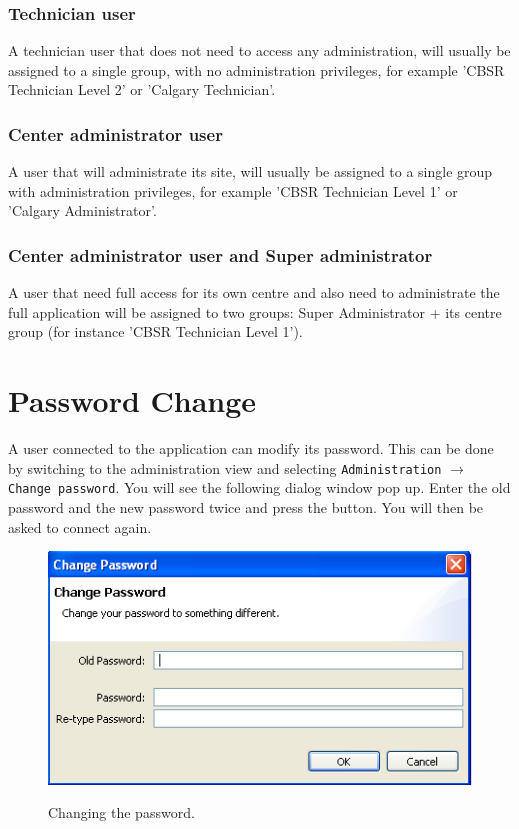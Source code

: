\subsubsection{Technician user}
A technician user that does not need to access any administration, will usually be assigned to a single group, with no administration privileges, for example 'CBSR Technician Level 2' or 'Calgary Technician'.

\subsubsection{Center administrator user}
A user that will administrate its site, will usually be assigned to a single group with administration privileges, for example 'CBSR Technician Level 1' or 'Calgary Administrator'.

\subsubsection{Center administrator user and Super administrator}
A user that need full access for its own centre and also need to administrate the full application will be assigned to two groups: Super Administrator + its centre group (for instance 'CBSR Technician Level 1').

\section{Password Change}

A user connected to the application can modify its password. This can be done by switching to the administration view and selecting \texttt{Administration} $\to$ \texttt{Change password}. You will see the following dialog window pop up. Enter the old password and the new password twice and press the  button. You will then be asked to connect again.
\begin{figure}[H]
  \centering
  \scalebox{0.5}
	   { \includegraphics*{screenshots/administration/change_password} }
	   \caption{Changing the password.}
	   \label{fig:change_password}
\end{figure}

